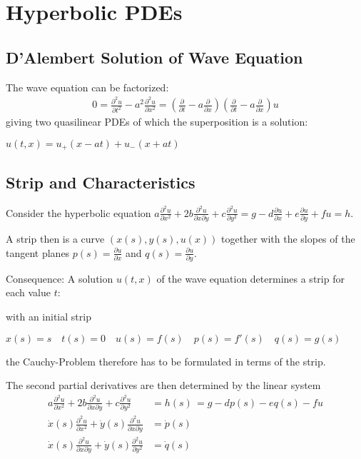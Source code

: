 \section{Hyperbolic PDEs}
\subsection{D'Alembert Solution of Wave Equation}
The wave equation can be factorized:
\begin{align*}
    0 = \frac{\partial^2 u}{\partial t^2} - a^2 \frac{\partial^2 u}{\partial x^2}
    = \left(
    \frac{\partial}{\partial t}-a\frac{\partial}{\partial x}
    \right)
    \left(
    \frac{\partial}{\partial t}-a\frac{\partial}{\partial x}
    \right)
    u
\end{align*}
giving two quasilinear PDEs of which the superposition is a solution:

$u(t,x) = u_+(x-at)+u_-(x+at)$

\subsection{Strip and Characteristics}

Consider the hyperbolic equation
\colorbox{shadecolor}{$
    \displaystyle
    a\frac{\partial^{2}u}{\partial x^{2}}+2b\frac{\partial^{2}u}{\partial x\partial y}+c\frac{\partial^{2}u}{\partial y^{2}}=g-d\frac{\partial u}{\partial x}+e\frac{\partial u}{\partial y}+f u=h.
$}

A strip then is a curve $(x(s), y(s), u(x))$ together with the slopes of the tangent planes
$p(s) = \frac{\partial u}{\partial x}$ and $q(s) = \frac{\partial u}{\partial y}$.

Consequence: A solution $u(t,x)$ of the wave equation determines a strip for each value $t$:

with an initial strip

$x(s) = s\quad t(s) = 0\quad u(s) = f(s)\quad p(s) = f'(s)\quad q(s)=g(s)$

the Cauchy-Problem therefore has to be formulated in terms of the strip.

The second partial derivatives are then determined by the linear system
\begin{align*}
    a\frac{\partial^{2}u}{\partial x^{2}}+2b\frac{\partial^{2}u}{\partial x\partial y}
    + c\frac{\partial^{2}u}{\partial y^{2}} & = h(s)\,=g-d p(s)-e q(s)-f u \\
    \dot{x}(s)\frac{\partial^{2}u}{\partial x^{2}}+\dot{y}(s)\frac{\partial^{2}u}{\partial x\partial y} & = \dot{p}(s) \\
    \dot{x}(s)\frac{\partial^{2}u}{\partial x\partial y} + \dot{y}(s)\frac{\partial^{2}u}{\partial y^2} & = \dot{q}(s)
\end{align*}

